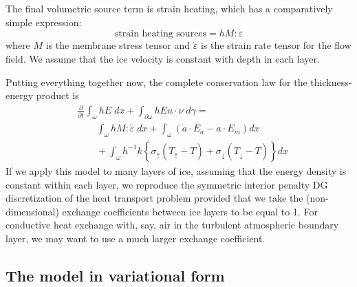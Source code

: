 \documentclass{article}
\theoremstyle{definition}
\theoremstyle{plain}
\begin{document}
The final volumetric source term is strain heating, which has a comparatively simple expression:
\begin{equation}
    \text{strain heating sources} = h M : \dot\varepsilon
\end{equation}
where $M$ is the membrane stress tensor and $\dot\varepsilon$ is the strain rate tensor for the flow field.
We assume that the ice velocity is constant with depth in each layer.

Putting everything together now, the complete conservation law for the thickness-energy product is
\begin{align}
    & \frac{\partial}{\partial t}\int_\omega hE\;dx + \int_{\partial\omega}hEu\cdot\nu\;d\gamma = \nonumber\\
    & \qquad \int_\omega h M:\dot\varepsilon\;dx + \int_\omega\left(\dot a\cdot E_{\dot a} - \dot a\cdot E_{\dot m}\right)dx \nonumber\\
    & \qquad + \int_\omega h^{-1}k\left\{\sigma_{\uparrow}(T_{\uparrow} - T) + \sigma_{\downarrow}(T_{\downarrow} - T)\right\}dx
\end{align}
If we apply this model to many layers of ice, assuming that the energy density is constant within each layer, we reproduce the symmetric interior penalty DG discretization of the heat transport problem provided that we take the (non-dimensional) exchange coefficients between ice layers to be equal to 1.
For conductive heat exchange with, say, air in the turbulent atmospheric boundary layer, we may want to use a much larger exchange coefficient.


\subsection{The model in variational form}
\end{document}
